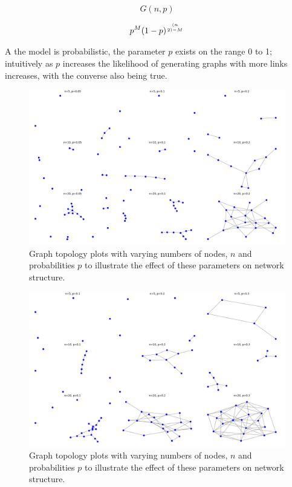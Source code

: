 \begin{equation}
    G(n,p)
\end{equation}

\begin{equation}
    p^M(1-p)^{(n \atop 2)-M}
\end{equation}

A the model is probabilistic, the parameter $p$ exists on the range 0 to 1; intuitively as $p$ increases the likelihood of generating graphs with more links increases, with the converse also being true.

\begin{figure}
    \centering
    \includegraphics[width=0.75\linewidth]{images/ER/low_prob/low_prob_5,10,20.png}
    \caption{Graph topology plots with varying numbers of nodes, $n$ and probabilities $p$ to illustrate the effect of these parameters on network structure.}
    \label{fig:low_prob_5,10,20}
\end{figure}

\begin{figure}
    \centering
    \includegraphics[width=0.75\linewidth]{images/ER/5,10,20.png}
    \caption{Graph topology plots with varying numbers of nodes, $n$ and probabilities $p$ to illustrate the effect of these parameters on network structure.}
    \label{fig:5,10,20}
\end{figure}

